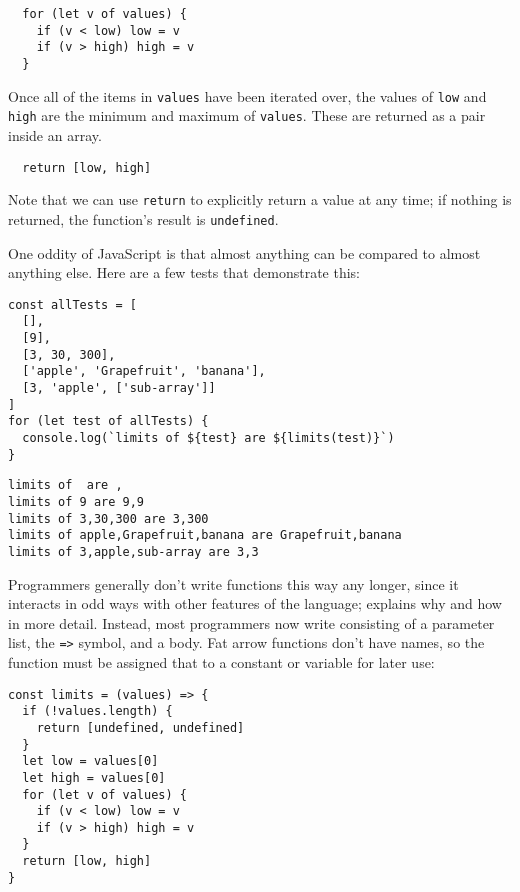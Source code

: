 \begin{verbatim}
  for (let v of values) {
    if (v < low) low = v
    if (v > high) high = v
  }
\end{verbatim}

Once all of the items in \texttt{values} have been iterated over,
the values of \texttt{low} and \texttt{high} are the minimum and maximum of \texttt{values}.
These are returned as a pair inside an array.

\begin{verbatim}
  return [low, high]
\end{verbatim}

\noindent
Note that we can use \texttt{return} to explicitly return a value at any time;
if nothing is returned,
the function's result is \texttt{undefined}.

One oddity of JavaScript is that almost anything can be compared to almost anything else.
Here are a few tests that demonstrate this:

\begin{verbatim}
const allTests = [
  [],
  [9],
  [3, 30, 300],
  ['apple', 'Grapefruit', 'banana'],
  [3, 'apple', ['sub-array']]
]
for (let test of allTests) {
  console.log(`limits of ${test} are ${limits(test)}`)
}
\end{verbatim}

\begin{verbatim}
limits of  are ,
limits of 9 are 9,9
limits of 3,30,300 are 3,300
limits of apple,Grapefruit,banana are Grapefruit,banana
limits of 3,apple,sub-array are 3,3
\end{verbatim}

Programmers generally don't write functions this way any longer,
since it interacts in odd ways with other features of the language;
 explains why and how in more detail.
Instead,
most programmers now write 
consisting of a parameter list,
the \texttt{=\textgreater{}} symbol,
and a body.
Fat arrow functions don't have names,
so the function must be assigned that to a constant or variable for later use:

\begin{verbatim}
const limits = (values) => {
  if (!values.length) {
    return [undefined, undefined]
  }
  let low = values[0]
  let high = values[0]
  for (let v of values) {
    if (v < low) low = v
    if (v > high) high = v
  }
  return [low, high]
}
\end{verbatim}

